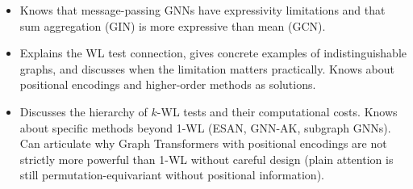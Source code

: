 \begin{interviewq}
\goodgreat
\begin{itemize}
    \item {} Knows that message-passing GNNs have expressivity limitations and that sum aggregation (GIN) is more expressive than mean (GCN).
    \item {} Explains the WL test connection, gives concrete examples of indistinguishable graphs, and discusses when the limitation matters practically. Knows about positional encodings and higher-order methods as solutions.
    \item {} Discusses the hierarchy of $k$-WL tests and their computational costs. Knows about specific methods beyond 1-WL (ESAN, GNN-AK, subgraph GNNs). Can articulate why Graph Transformers with positional encodings are not strictly more powerful than 1-WL without careful design (plain attention is still permutation-equivariant without positional information).
\end{itemize}

\end{interviewq}

